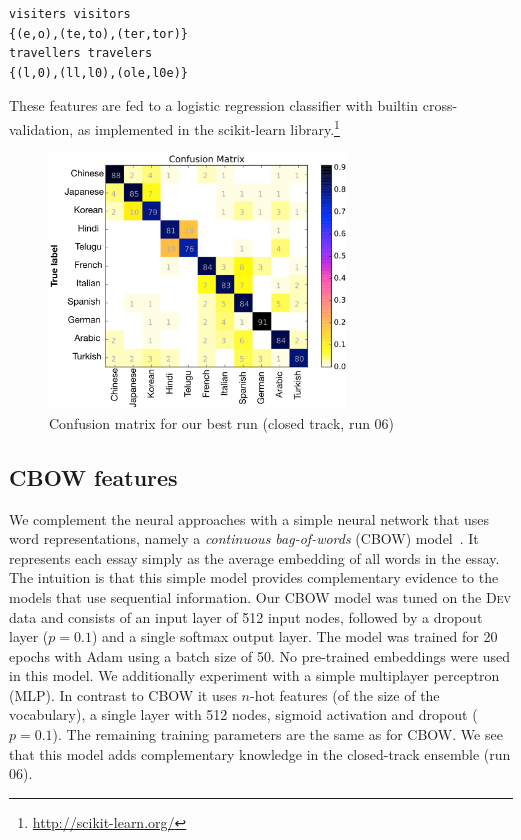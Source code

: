 \documentclass[11pt,letterpaper]{article}
\begin{document}
\begin{verbatim}
visiters visitors
{(e,o),(te,to),(ter,tor)}
travellers travelers
{(l,0),(ll,l0),(ole,l0e)}
\end{verbatim}

These features are fed to a logistic regression classifier with builtin cross-validation, as implemented in the scikit-learn library.\footnote{\url{http://scikit-learn.org/}}

\begin{figure}[ht]
\centering
\includegraphics[width=0.7\textwidth]{confusion_matrix_run06closed}
\caption{Confusion matrix for our best run (closed track, run 06)}
\label{fig:conf_mat}
\end{figure}

\subsection{CBOW features}
We complement the neural approaches with a simple neural network that uses word representations, namely a \textit{continuous bag-of-words} (CBOW) model~\cite{mikolov2013efficient}. It represents each essay simply as the average embedding of all words in the essay. The intuition is that this simple model provides complementary evidence to the models  that use sequential information. Our CBOW model was tuned on the \textsc{Dev} data and consists of an input layer of 512 input nodes, followed by a dropout layer ($p=0.1$) and a single softmax output layer. The model was trained for 20 epochs with Adam using a batch size of 50. No pre-trained embeddings were used in this model.
We additionally experiment with a simple multiplayer perceptron (MLP). In contrast to CBOW it uses $n$-hot features (of the size of the vocabulary), a single layer with 512 nodes, sigmoid activation and dropout ($p=0.1$). The remaining training parameters are the same as for CBOW. We see that this model adds complementary knowledge in the closed-track ensemble (run 06).
\end{document}
